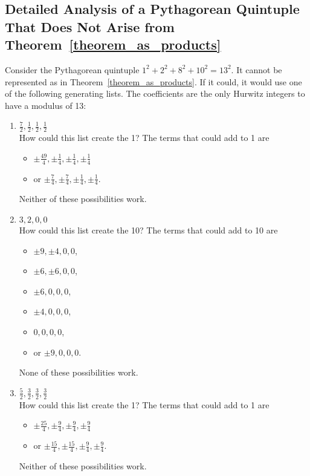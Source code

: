 \documentclass[12pt,table]{article}
\theoremstyle{definition}
\theoremstyle{remark}
\numberwithin{equation}{section}
\begin{document}
\begin{appendices}

\section{Detailed Analysis of a Pythagorean Quintuple That Does Not Arise from
Theorem~\ref{theorem_as_products}}
\label{appendix_A}



Consider the Pythagorean quintuple
$1^2 + 2^2 + 8^2 + 10^2 = 13^2$.
It
cannot be represented as in
Theorem~\ref{theorem_as_products}.
If it could, it would use one of the following generating lists.
The
coefficients are the only Hurwitz integers to have a modulus of 13:



\begin{enumerate}

\item $ \frac{7}{2},\frac{1}{2}, \frac{1}{2}, \frac{1}{2}  $\\
How could this list create the 1?
The terms that could add to 1 are
\begin{itemize}
\item $ \pm\frac{49}{4},\pm\frac{1}{4}, \pm\frac{1}{4}, \pm\frac{1}{4}  $  
\item or $ \pm\frac{7}{4},\pm\frac{7}{4}, \pm\frac{1}{4}, \pm\frac{1}{4}  $. 
\end{itemize}
Neither of these possibilities work.


\item $3,2,0,0$\\
How could this list create the 10?
The terms that could add to 10 are
\begin{itemize}
\item$ \pm9,\pm4, 0, 0  $,
\item$ \pm6,\pm6, 0, 0  $,
\item$ \pm6,0, 0, 0  $,
\item$ \pm4,0, 0, 0  $,
\item$ 0,0, 0, 0  $,
\item or $ \pm9,0, 0, 0  $.
\end{itemize}
None of these possibilities work.


\item $ \frac{5}{2},\frac{3}{2}, \frac{3}{2}, \frac{3}{2}  $\\
How could this list create the 1?
The terms that could add to 1 are
\begin{itemize}
\item$ \pm\frac{25}{4},\pm\frac{9}{4}, \pm\frac{9}{4}, \pm\frac{9}{4}  $  
\item or $ \pm\frac{15}{4},\pm\frac{15}{4}, \pm\frac{9}{4}, \pm\frac{9}{4}  $. 
\end{itemize}
Neither of these possibilities work.




\end{enumerate}
\end{appendices}
\end{document}
